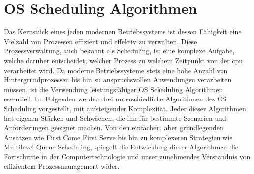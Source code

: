 \chapter{OS Scheduling Algorithmen}
Das Kernstück eines jeden modernen Betriebssystems ist dessen Fähigkeit eine Vielzahl von Prozessen effizient und effektiv zu verwalten. Diese Prozessverwaltung, auch bekannt als Scheduling, ist eine komplexe Aufgabe, welche darüber entscheidet, welcher Prozess zu welchem Zeitpunkt von der \ac{cpu} verarbeitet wird. Da moderne Betriebssysteme stets eine hohe Anzahl von Hintergrundprozessen bis hin zu anspruchsvollen Anwendungen verarbeiten müssen, ist die Verwendung leistungsfähiger OS Scheduling Algorithmen essentiell. Im Folgenden werden drei unterschiedliche Algorithmen des OS Scheduling vorgestellt, mit aufsteigender Komplexität. Jeder dieser Algorithmen hat eigenen Stärken und Schwächen, die ihn für bestimmte Szenarien und Anforderungen geeignet machen. Von den einfachen, aber grundlegenden Ansätzen wie First Come First Serve bis hin zu komplexeren Strategien wie Multilevel Queue Scheduling, spiegelt die Entwicklung dieser Algorithmen die Fortschritte in der Computertechnologie und unser zunehmendes Verständnis von effizientem Prozessmanagement wider.
